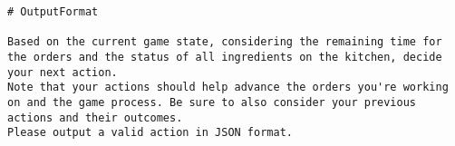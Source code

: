 \begin{lstlisting}
# OutputFormat

Based on the current game state, considering the remaining time for the orders and the status of all ingredients on the kitchen, decide your next action.
Note that your actions should help advance the orders you're working on and the game process. Be sure to also consider your previous actions and their outcomes.
Please output a valid action in JSON format.
\end{lstlisting}

